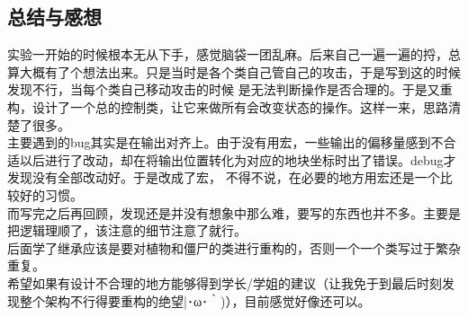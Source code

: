 \documentclass[12pt,a4paper,UTF8]{article}
\begin{document}
\subsection{总结与感想}
实验一开始的时候根本无从下手，感觉脑袋一团乱麻。后来自己一遍一遍的捋，总算大概有了个想法出来。只是当时是各个类自己管自己的攻击，于是写到这的时候发现不行，当每个类自己移动攻击的时候
是无法判断操作是否合理的。于是又重构，设计了一个总的控制类，让它来做所有会改变状态的操作。这样一来，思路清楚了很多。\\
主要遇到的bug其实是在输出对齐上。由于没有用宏，一些输出的偏移量感到不合适以后进行了改动，却在将输出位置转化为对应的地块坐标时出了错误。debug才发现没有全部改动好。于是改成了宏，
不得不说，在必要的地方用宏还是一个比较好的习惯。\\
而写完之后再回顾，发现还是并没有想象中那么难，要写的东西也并不多。主要是把逻辑理顺了，该注意的细节注意了就行。\\
后面学了继承应该是要对植物和僵尸的类进行重构的，否则一个一个类写过于繁杂重复。\\
希望如果有设计不合理的地方能够得到学长/学姐的建议（让我免于到最后时刻发现整个架构不行得要重构的绝望|･ω･｀)），目前感觉好像还可以。


%

      
  
\end{document}
